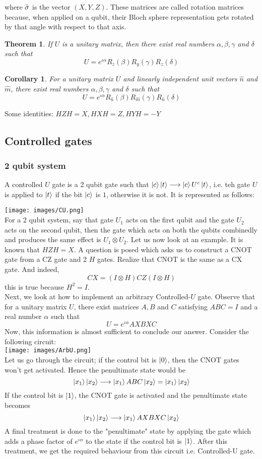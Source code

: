 \documentclass{article}
\newtheorem{theorem}{Theorem}
\newtheorem{cor}{Corollary}
\begin{document}
where $\Bar{\sigma}$ is the vector $(X, Y, Z)$. These matrices are called rotation matrices because, when applied on a qubit, their Bloch sphere representation gets rotated by that angle with respect to that axis.
\begin{theorem}
If $U$ is a unitary matrix, then there exist real numbers $\alpha, \beta, \gamma$ and $\delta$ such that $$U = e^{\iota \alpha}R_z (\beta)R_y (\gamma) R_z (\delta)$$
\end{theorem}
\begin{cor}
For a unitary matrix $U$ and linearly independent unit vectors $\hat{n}$ and $\hat{m}$, there exist real numbers $\alpha, \beta, \gamma$ and $\delta$ such that $$U = e^{\iota \alpha}R_{\hat{n}} (\beta)R_{\hat{m}} (\gamma) R_{\hat{n}} (\delta)$$
\end{cor}
Some identities: $HZH = X, HXH = Z, HYH = -Y$
\newpage

\subsection{Controlled gates}
\subsubsection{2 qubit system}
A controlled $U$ gate is a 2 qubit gate such that $\ket{c}\ket{t} \longrightarrow \ket{c} U^c\ket{t}$, i.e. teh gate $U$ is applied to $\ket{t}$ if the bit $\ket{c}$ is $1$, otherwise it is not. It is represented as follows:

\texttt{[image: images/CU.png]}\\
For a 2 qubit system, say that gate $U_1$ acts on the first qubit and the gate $U_2$ acts on the second qubit, then the gate which acts on both the qubits combinedly and produces the same effect is $U_1 \otimes U_2$. Let us now look at an example. It is known that $HZH = X$. A question is posed which asks us to construct a CNOT gate from a CZ gate and 2 $H$ gates. Realize that CNOT is the same as a CX gate. And indeed, $$CX = (I\otimes H)CZ(I\otimes H)$$
this is true because $H^2 = I$.\\[4pt]
Next, we look at how to implement an arbitrary Controlled-$U$ gate. Observe that for a unitary matrix $U$, there exist matrices $A, B$ and $C$ satisfying $ABC = I$ and a real number $\alpha$ such that $$U = e^{\iota \alpha}AXBXC$$ 
Now, this information is almost sufficient to conclude our answer. Consider the following circuit:\\
\texttt{[image: images/ArbU.png]}\\
Let us go through the circuit; if the control bit is $\ket{0}$, then the CNOT gates won't get activated. Hence the penultimate state would be $$\ket{x_1}\ket{x_2} \longrightarrow \ket{x_1}ABC\ket{x_2} = \ket{x_1}\ket{x_2}$$ If the control bit is $\ket{1}$, the CNOT gate is activated and the penultimate state becomes $$\ket{x_1}\ket{x_2} \longrightarrow \ket{x_1}AXBXC\ket{x_2}$$
A final treatment is done to the "penultimate" state by applying the gate which adds a phase factor of $e^{\iota \alpha}$ to the state if the control bit is $\ket{1}$. After this treatment, we get the required behaviour from this circuit i.e. Controlled-U gate.
\end{document}

